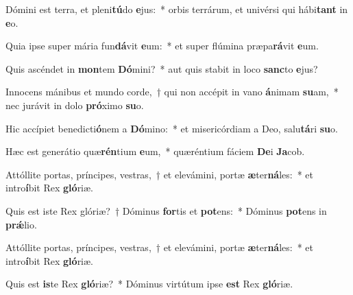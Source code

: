 \item Dómini est terra, et pleni\textbf{tú}do \textbf{e}jus:~* orbis terrárum, et univérsi qui hábi\textbf{tant} in \textbf{e}o.
\item Quia ipse super mária fun\textbf{dá}vit \textbf{e}um:~* et super flúmina præpa\textbf{rá}vit \textbf{e}um.
\item Quis ascéndet in \textbf{mon}tem \textbf{Dó}mini?~* aut quis stabit in loco \textbf{sanc}to \textbf{e}jus?
\item Innocens mánibus et mundo corde,~† qui non accépit in vano \textbf{á}nimam \textbf{su}am,~* nec jurávit in dolo \textbf{pró}ximo \textbf{su}o.
\item Hic accípiet benedicti\textbf{ó}nem a \textbf{Dó}mino:~* et misericórdiam a Deo, salu\textbf{tá}ri \textbf{su}o.
\item Hæc est generátio quæ\textbf{rén}tium \textbf{e}um,~* quæréntium fáciem \textbf{De}i \textbf{Ja}cob.
\item Attóllite portas, príncipes, vestras,~† et elevámini, portæ \textbf{æ}ter\textbf{ná}les:~* et intro\textbf{í}bit Rex \textbf{gló}riæ.
\item Quis est iste Rex glóriæ?~† Dóminus \textbf{for}tis et \textbf{pot}ens:~* Dóminus \textbf{pot}ens in \textbf{prǽ}lio.
\item Attóllite portas, príncipes, vestras,~† et elevámini, portæ \textbf{æ}ter\textbf{ná}les:~* et intro\textbf{í}bit Rex \textbf{gló}riæ.
\item Quis est \textbf{is}te Rex \textbf{gló}riæ?~* Dóminus virtútum ipse \textbf{est} Rex \textbf{gló}riæ.
